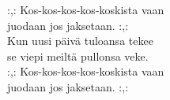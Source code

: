 
:,: Kos-kos-kos-kos-koskista vaan \\ juodaan jos jaksetaan. :,: \\ Kun uusi päivä tuloansa tekee \\ se viepi meiltä pullonsa veke. \\ :,: Kos-kos-kos-kos-koskista vaan \\ juodaan jos jaksetaan. :,: